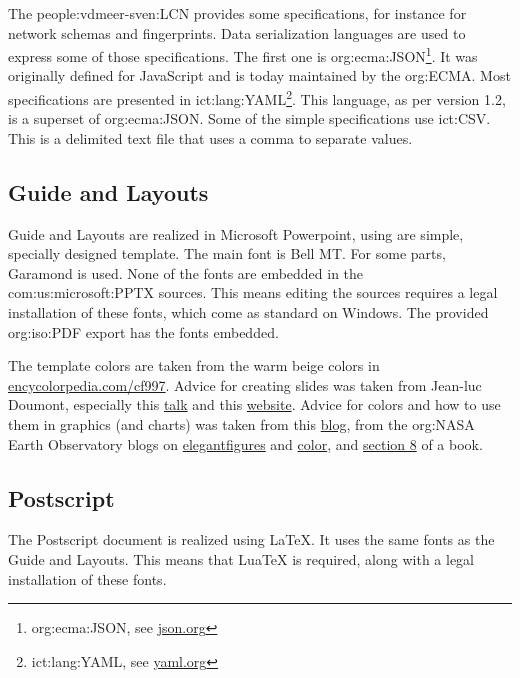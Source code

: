     The \ac{people:vdmeer-sven:LCN} provides some specifications, for instance for network schemas and fingerprints.
    Data serialization languages are used to express some of those specifications.
    The first one is \acs{org:ecma:JSON}\footnote{\ac{org:ecma:JSON}, see \href{https://www.json.org/}{json.org}}.
        It was originally defined for JavaScript and is today maintained by the \acs{org:ECMA}.
    Most specifications are presented in \acs{ict:lang:YAML}\footnote{\ac{ict:lang:YAML}, see \href{https://yaml.org/}{yaml.org}}.
        This language, as per version 1.2, is a superset of \ac{org:ecma:JSON}.
    Some of the simple specifications use \ac{ict:CSV}.
        This is a delimited text file that uses a comma to separate values.


\subsection{Guide and Layouts}
    Guide and Layouts are realized in Microsoft Powerpoint, using are simple, specially designed template.
    The main font is Bell MT.
    For some parts, Garamond is used.
    None of the fonts are embedded in the \acs{com:us:microsoft:PPTX} sources.
    This means editing the sources requires a legal installation of these fonts, which come as standard on Windows.
    The provided \acs{org:iso:PDF} export has the fonts embedded.

    The template colors are taken from the warm beige colors in \href{https://encycolorpedia.com/cfb997}{encycolorpedia.com/cf997}.
    Advice for creating slides was taken from Jean-luc Doumont, especially this \href{https://www.youtube.com/watch?v=meBXuTIPJQk}{talk}
        and this \href{http://www.principiae.be/X0800.php}{website}.
    Advice for colors and how to use them in graphics (and charts) was taken from
        this \href{https://medium.com/@Elijah_Meeks/color-advice-for-data-visualization-with-d3-js-33b5adc41c90}{blog},
        from the \acs{org:NASA} Earth Observatory blogs on \href{https://earthobservatory.nasa.gov/blogs/elegantfigures/}{elegantfigures} and \href{https://earthobservatory.nasa.gov/blogs/elegantfigures/category/color/}{color}, and
        \href{https://socviz.co/refineplots.html}{section 8} of a book.


\subsection{Postscript}
    The Postscript document is realized using \LaTeX.
    It uses the same fonts as the Guide and Layouts.
    This means that LuaTeX is required, along with a legal installation of these fonts.

